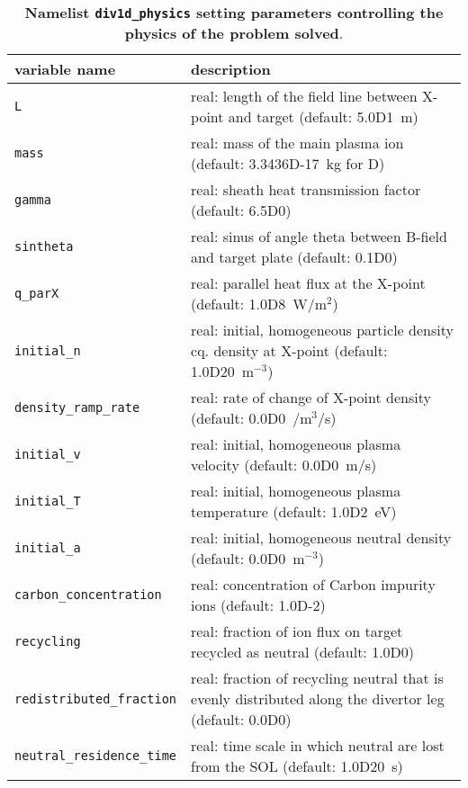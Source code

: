 \documentclass[amsmath,amssymb,a4]{revtex4-2}
\begin{document}
\begin{table}[h]
\begin{center}
  \caption{{\bf Namelist {\tt div1d\_physics} setting parameters controlling the physics of the problem solved}.}
  \label{tab:input_numerics}
  \begin{tabular}{|| l  | l ||}
    \hline\hline
    variable name                & description \\ \hline\hline
    {\tt L}                      & real: length of the field line between X-point and target (default: 5.0D1~m) \\ \hline
    {\tt mass}                   & real: mass of the main plasma ion (default: 3.3436D-17~kg for D) \\ \hline
    {\tt gamma}                  & real: sheath heat transmission factor (default: 6.5D0) \\ \hline
    {\tt sintheta}               & real: sinus of angle theta between B-field and target plate (default: 0.1D0) \\ \hline
    {\tt q\_parX}                & real: parallel heat flux at the X-point (default: 1.0D8~W/m$^2$) \\ \hline
    {\tt initial\_n}             & real: initial, homogeneous particle density cq. density at X-point (default: 1.0D20~m$^{-3}$) \\ \hline
    {\tt density\_ramp\_rate}    & real: rate of change of X-point density (default: 0.0D0~/m$^3$/s) \\ \hline
    {\tt initial\_v}             & real: initial, homogeneous plasma velocity (default: 0.0D0~m/s) \\ \hline
    {\tt initial\_T}             & real: initial, homogeneous plasma temperature (default: 1.0D2~eV) \\ \hline
    {\tt initial\_a}             & real: initial, homogeneous neutral density (default: 0.0D0~m$^{-3}$) \\ \hline
    {\tt carbon\_concentration}  & real: concentration of Carbon impurity ions (default: 1.0D-2) \\ \hline
    {\tt recycling}              & real: fraction of ion flux on target recycled as neutral (default: 1.0D0) \\ \hline
    {\tt redistributed\_fraction}& real: fraction of recycling neutral that is evenly distributed along the divertor leg (default: 0.0D0) \\ \hline
    {\tt neutral\_residence\_time}& real: time scale in which neutral are lost from the SOL (default: 1.0D20~s) \\ \hline

\end{tabular}
\end{center}
\end{table}
\end{document}

